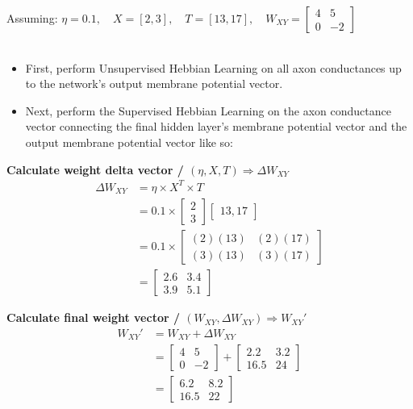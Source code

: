 \documentclass[12 pt]{article}
\begin{document}
	Assuming:
		$
			\eta = 0.1,
			\quad X = [2, 3],
			\quad T = [13, 17],
			\quad W_{XY} = \begin{bmatrix}4 & 5\\0 & -2\end{bmatrix}
		$\\\\

	\begin{itemize}
		\item First, perform Unsupervised Hebbian Learning on all axon conductances up to the network's output membrane potential vector.
		\item Next, perform the Supervised Hebbian Learning on the axon conductance vector connecting the final hidden layer's membrane potential vector and the output membrane potential vector like so:
	\end{itemize}

	\textbf{Calculate weight delta vector / $(\eta, X, T) \Rightarrow \Delta W_{XY}$}
	\begin{align*}
		\Delta W_{XY} &= \eta \times X^T \times T\\
		&= 0.1 \times \begin{bmatrix}2\\3\end{bmatrix} \begin{bmatrix}13,17\end{bmatrix}\\
		&= 0.1 \times \begin{bmatrix}(2)(13) & (2)(17)\\(3)(13) & (3)(17)\end{bmatrix}\\
		&= \begin{bmatrix}2.6 & 3.4\\3.9 & 5.1\end{bmatrix}
	\end{align*}
	
	\textbf{Calculate final weight vector / $(W_{XY}, \Delta W_{XY}) \Rightarrow W_{XY}'$}
	\begin{align*}
		W_{XY}' &= W_{XY} + \Delta W_{XY}\\
		&= \begin{bmatrix}4 & 5\\0 & -2\end{bmatrix} + \begin{bmatrix}2.2 & 3.2\\16.5 & 24\end{bmatrix}\\
		&= \begin{bmatrix}6.2 & 8.2\\16.5 & 22\end{bmatrix}
	\end{align*}
\end{document}
